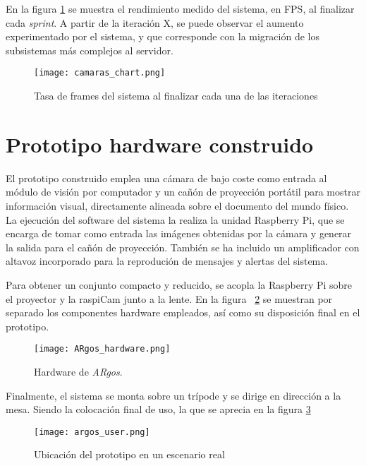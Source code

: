 En la figura \ref{fig:iteration_chart} se muestra el rendimiento medido del sistema, en FPS, al finalizar cada \textit{sprint}. A partir de la iteración X, se puede observar el aumento experimentado por el sistema, y que corresponde con la migración de los subsistemas más complejos al servidor.

\begin{figure}
 \begin{center}
    \texttt{[image: camaras\_chart.png]}
    \caption{Tasa de frames del sistema al finalizar cada una de las iteraciones}
    \label{fig:iteration_chart}
  \end{center}
\end{figure}

\section{Prototipo hardware construido}
El prototipo construido emplea una cámara de bajo coste como entrada al módulo de visión por computador y un cañón de proyección portátil para mostrar información visual, directamente alineada sobre el documento del mundo físico. La ejecución del software del sistema la realiza la unidad Raspberry Pi, que se encarga de tomar como entrada las imágenes obtenidas por la cámara y generar la salida para el cañón de proyección. También se ha incluido un amplificador con altavoz incorporado para la reprodución de mensajes y alertas del sistema.

Para obtener un conjunto compacto y reducido, se acopla la Raspberry Pi sobre el proyector y la raspiCam junto a la lente. En la figura ~\ref{fig:ARgos_hardware} se muestran por separado los componentes hardware empleados, así como su disposición final en el prototipo.

\begin{figure}
  \begin{center}
    \texttt{[image: ARgos\_hardware.png]}
    \caption{Hardware de \textit{ARgos}.}
    \label{fig:ARgos_hardware}
  \end{center}
\end{figure}

Finalmente, el sistema se monta sobre un trípode y se dirige en dirección a la mesa. Siendo la colocación final de uso, la que se aprecia en la figura \ref{fig:ARgos_user} 

\begin{figure}
  \begin{center}
    \texttt{[image: argos\_user.png]}
    \caption{Ubicación del prototipo en un escenario real}
    \label{fig:ARgos_user}
  \end{center}
\end{figure}

